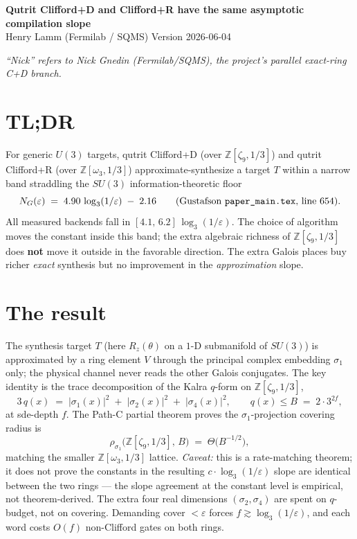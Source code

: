 \documentclass[10pt]{article}
\newcommand{\Z}{\mathbb{Z}}
\newcommand{\zn}{\zeta_9}
\newcommand{\Zzn}{\Z[\zn,1/3]}
\newcommand{\Zom}{\Z[\omega_3,1/3]}
\newcommand{\eps}{\varepsilon}
\begin{document}
\begin{center}
{\large\bf Qutrit Clifford{+}D and Clifford{+}R have the same asymptotic compilation slope}\\[2pt]
{\small Henry Lamm (Fermilab / SQMS) \quad\textbullet\quad Version 2026-06-04}
\end{center}

\vspace{-4pt}
\noindent\emph{\small ``Nick'' refers to Nick Gnedin (Fermilab/SQMS), the project's parallel exact-ring C{+}D branch.}

\section*{TL;DR}

For generic $U(3)$ targets, qutrit Clifford{+}D (over $\Zzn$) and qutrit Clifford{+}R (over $\Zom$) approximate-synthesize a target $T$ within a narrow band straddling the $SU(3)$ information-theoretic floor
\begin{equation}
N_{G}(\eps) \;=\; 4.90\,\log_{3}(1/\eps)\;-\;2.16 \qquad
\text{(Gustafson \texttt{paper\_main.tex}, line 654).}
\label{eq:info-floor}
\end{equation}
All measured backends fall in $[4.1,\,6.2]\,\log_3(1/\eps)$. The choice of algorithm moves the constant inside this band; the extra algebraic richness of $\Zzn$ does \textbf{not} move it outside in the favorable direction. The extra Galois places buy richer \emph{exact} synthesis but no improvement in the \emph{approximation} slope.

\section*{The result}

The synthesis target $T$ (here $R_z(\theta)$ on a $1$-D submanifold of $SU(3)$) is approximated by a ring element $V$ through the principal complex embedding $\sigma_1$ only; the physical channel never reads the other Galois conjugates. The key identity is the trace decomposition of the Kalra $q$-form on $\Zzn$,
\begin{equation}
3\,q(x) \;=\; |\sigma_1(x)|^2 \;+\; |\sigma_2(x)|^2 \;+\; |\sigma_4(x)|^2,
\qquad q(x) \le B \;=\; 2\cdot 3^{2f},
\label{eq:qform}
\end{equation}
at sde-depth $f$. The Path-C partial theorem proves the $\sigma_1$-projection covering radius is
\begin{equation}
\rho_{\sigma_1}\!\bigl(\Zzn,\,B\bigr) \;=\; \Theta\!\bigl(B^{-1/2}\bigr),
\label{eq:path-c}
\end{equation}
matching the smaller $\Zom$ lattice. \emph{Caveat:} this is a rate-matching theorem; it does not prove the constants in the resulting $c\cdot\log_3(1/\eps)$ slope are identical between the two rings --- the slope agreement at the constant level is empirical, not theorem-derived. The extra four real dimensions $(\sigma_2,\sigma_4)$ are spent on $q$-budget, not on covering. Demanding cover $<\eps$ forces $f\gtrsim\log_3(1/\eps)$, and each word costs $O(f)$ non-Clifford gates on both rings.
\end{document}
